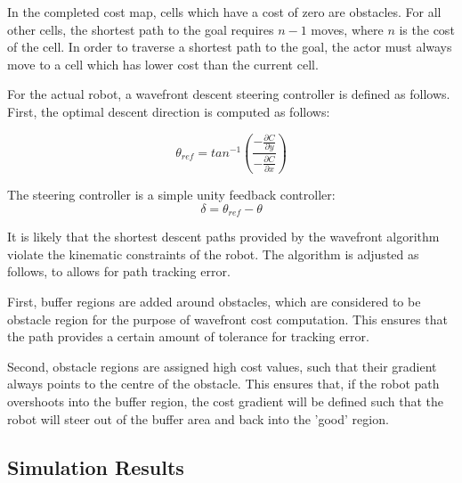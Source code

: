 \documentclass[11pt]{article} %
\begin{document}
In the completed cost map, cells which have a cost of zero are obstacles.  For all other cells, the shortest path to the goal requires $n-1$ moves, where $n$ is the cost of the cell.  In order to traverse a shortest path to the goal, the actor must always move to a cell which has lower cost than the current cell.

For the actual robot, a wavefront descent steering controller is defined as follows.  First, the optimal descent direction is computed as follows:

\begin{equation}
\theta_{ref} = tan^{-1}( \frac{ - \frac{\partial C}{\partial y} }{ - \frac{\partial C}{\partial x} } )
\end{equation}

The steering controller is a simple unity feedback controller:
\begin{equation}
\delta = \theta_{ref} - \theta 
\end{equation}

It is likely that the shortest descent paths provided by the wavefront algorithm violate the kinematic constraints of the robot.  The algorithm is adjusted as follows, to allows for path tracking error.  

First, buffer regions are added around obstacles, which are considered to be obstacle region for the purpose of wavefront cost computation.  This ensures that the path provides a certain amount of tolerance for tracking error.

Second, obstacle regions are assigned high cost values, such that their gradient always points to the centre of the obstacle.  This ensures that, if the robot path overshoots into the buffer region, the cost gradient will be defined such that the robot will steer out of the buffer area and back into the 'good' region.

\subsection{Simulation Results}
\end{document}
